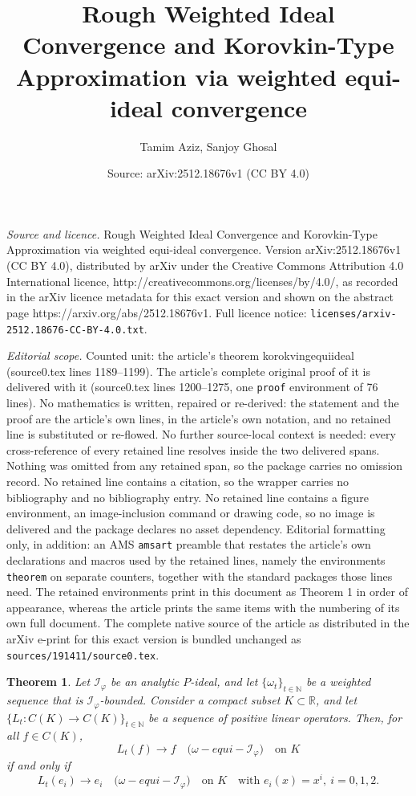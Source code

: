 \documentclass[10pt,a4paper]{amsart}
\title{Rough Weighted Ideal Convergence and Korovkin-Type Approximation via weighted equi-ideal convergence}
\author{Tamim Aziz, Sanjoy Ghosal}
\date{Source: arXiv:2512.18676v1 (CC BY 4.0)}
\newtheorem{theorem}{Theorem}
\begin{document}
\maketitle

\noindent\emph{Source and licence.} Rough Weighted Ideal Convergence and Korovkin-Type Approximation via weighted equi-ideal convergence. Version arXiv:2512.18676v1 (CC BY 4.0), distributed by arXiv under the Creative Commons Attribution 4.0 International licence, http://creativecommons.org/licenses/by/4.0/, as recorded in the arXiv licence metadata for this exact version and shown on the abstract page https://arxiv.org/abs/2512.18676v1. Full licence notice: \texttt{licenses/arxiv-2512.18676-CC-BY-4.0.txt}.\par\smallskip

\noindent\textit{Editorial scope.} Counted unit: the article's theorem korokvingequiideal (source0.tex lines 1189--1199). The article's complete original proof of it is delivered with it (source0.tex lines 1200--1275, one \texttt{proof} environment of 76 lines). No mathematics is written, repaired or re-derived: the statement and the proof are the article's own lines, in the article's own notation, and no retained line is substituted or re-flowed.  No further source-local context is needed: every cross-reference of every retained line resolves inside the two delivered spans.  Nothing was omitted from any retained span, so the package carries no omission record.  No retained line contains a citation, so the wrapper carries no bibliography and no bibliography entry.  No retained line contains a figure environment, an image-inclusion command or drawing code, so no image is delivered and the package declares no asset dependency.  Editorial formatting only, in addition: an AMS \texttt{amsart} preamble that restates the article's own declarations and macros used by the retained lines, namely the environments \texttt{theorem} on separate counters, together with the standard packages those lines need.  The retained environments print in this document as Theorem 1 in order of appearance, whereas the article prints the same items with the numbering of its own full document.  The complete native source of the article as distributed in the arXiv e-print for this exact version is bundled unchanged as \texttt{sources/191411/source0.tex}.
	\begin{theorem}	\label{korokvingequiideal}
		Let $\mathcal{I}_{\varphi}$ be an analytic $P$-ideal, and let $\{\omega_t\}_{t \in \mathbb{N}}$ be a weighted sequence that is $\mathcal{I}_{\varphi}$-bounded. Consider a compact subset $K \subset \mathbb{R}$, and let $\{L_t : C(K) \to C(K)\}_{t \in \mathbb{N}}$ be a sequence of positive linear operators.
		 Then, for all $f \in C(K)$, 
	\begin{equation*}
	L_t(f) \to f \quad \text{($\omega-equi-\mathcal{I}_{\varphi}$)} \quad \text{on } K \tag{a}
\end{equation*}
	if and only if
\begin{equation}
		L_t(e_i) \to e_i \quad \text{($\omega-equi-\mathcal{I}_{\varphi}$)} \quad \text{on } K \quad \text{with } e_i(x) = x^i, \ i = 0, 1, 2\tag{b}.
\end{equation}
\end{theorem}
\end{document}
